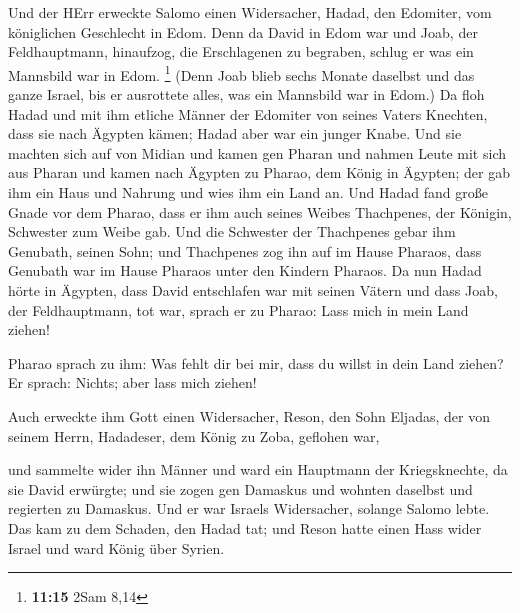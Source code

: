  Und der HErr erweckte Salomo einen Widersacher, Hadad, den
Edomiter, vom königlichen Geschlecht in Edom.  Denn da
David in Edom war und Joab, der Feldhauptmann, hinaufzog, die
Erschlagenen zu begraben, schlug er was ein Mannsbild war in Edom.
\footnote{\textbf{11:15} 2Sam 8,14}  (Denn Joab blieb sechs
Monate daselbst und das ganze Israel, bis er ausrottete alles, was ein
Mannsbild war in Edom.)  Da floh Hadad und mit ihm etliche
Männer der Edomiter von seines Vaters Knechten, dass sie nach Ägypten
kämen; Hadad aber war ein junger Knabe.  Und sie machten
sich auf von Midian und kamen gen Pharan und nahmen Leute mit sich aus
Pharan und kamen nach Ägypten zu Pharao, dem König in Ägypten; der gab
ihm ein Haus und Nahrung und wies ihm ein Land an.  Und
Hadad fand große Gnade vor dem Pharao, dass er ihm auch seines Weibes
Thachpenes, der Königin, Schwester zum Weibe gab.  Und die
Schwester der Thachpenes gebar ihm Genubath, seinen Sohn; und Thachpenes
zog ihn auf im Hause Pharaos, dass Genubath war im Hause Pharaos unter
den Kindern Pharaos.  Da nun Hadad hörte in Ägypten, dass
David entschlafen war mit seinen Vätern und dass Joab, der
Feldhauptmann, tot war, sprach er zu Pharao: Lass mich in mein Land
ziehen!

 Pharao sprach zu ihm: Was fehlt dir bei mir, dass du
willst in dein Land ziehen? Er sprach: Nichts; aber lass mich ziehen!

 Auch erweckte ihm Gott einen Widersacher, Reson, den Sohn
Eljadas, der von seinem Herrn, Hadadeser, dem König zu Zoba, geflohen
war,

 und sammelte wider ihn Männer und ward ein Hauptmann der
Kriegsknechte, da sie David erwürgte; und sie zogen gen Damaskus und
wohnten daselbst und regierten zu Damaskus.  Und er war
Israels Widersacher, solange Salomo lebte. Das kam zu dem Schaden, den
Hadad tat; und Reson hatte einen Hass wider Israel und ward König über
Syrien.


